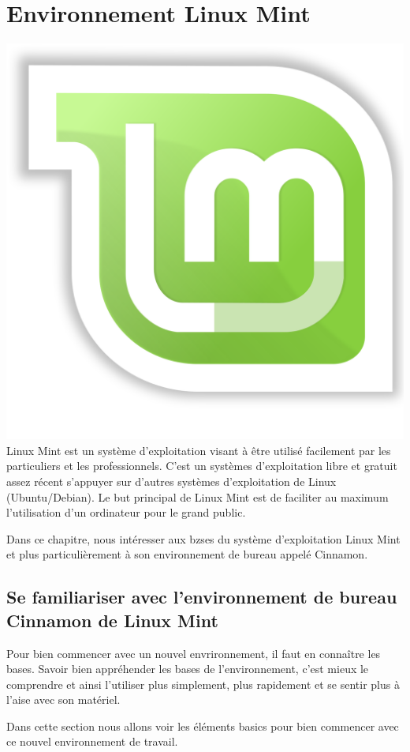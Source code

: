 \documentclass[12pt]{book}
\begin{document}
\chapter{Environnement Linux Mint}
	\includegraphics[scale=.05]{include/lm_logo.png}
Linux Mint est un système d'exploitation visant à être utilisé facilement par les particuliers et les professionnels.
C'est un systèmes d'exploitation libre et gratuit assez récent s'appuyer sur d'autres systèmes d'exploitation de Linux (Ubuntu/Debian).
Le but principal de Linux Mint est de faciliter au maximum l'utilisation d'un ordinateur pour le grand public.\par
Dans ce chapitre, nous intéresser aux bzses du système d'exploitation Linux Mint et plus particulièrement à son environnement de bureau appelé Cinnamon.
\section{Se familiariser avec l'environnement de bureau Cinnamon de Linux Mint}
	Pour bien commencer avec un nouvel envrironnement, il faut en connaître les bases.
	Savoir bien appréhender les bases de l'environnement, c'est mieux le comprendre et ainsi l'utiliser plus simplement, plus rapidement et se sentir plus à l'aise avec son matériel.\par
	Dans cette section nous allons voir les éléments basics pour bien commencer avec ce nouvel environnement de travail.
\end{document}
